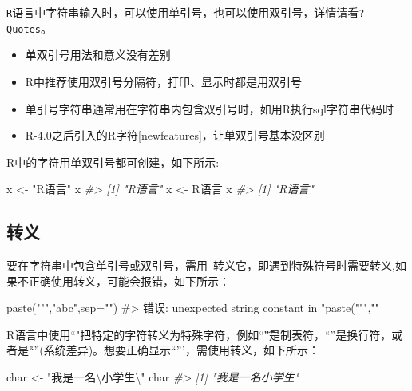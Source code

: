 \documentclass[
]{book}
\newenvironment{Shaded}{\begin{snugshade}}{\end{snugshade}}
\newcommand{\CommentTok}[1]{\textcolor[rgb]{0.56,0.35,0.01}{\textit{#1}}}
\newcommand{\FunctionTok}[1]{\textcolor[rgb]{0.00,0.00,0.00}{#1}}
\newcommand{\NormalTok}[1]{#1}
\newcommand{\OtherTok}[1]{\textcolor[rgb]{0.56,0.35,0.01}{#1}}
\newcommand{\SpecialCharTok}[1]{\textcolor[rgb]{0.00,0.00,0.00}{#1}}
\newcommand{\StringTok}[1]{\textcolor[rgb]{0.31,0.60,0.02}{#1}}
\begin{document}
\texttt{R}语言中字符串输入时，可以使用单引号，也可以使用双引号，详情请看\texttt{?Quotes}。

\begin{itemize}
\item
  单双引号用法和意义没有差别
\item
  R中推荐使用双引号分隔符，打印、显示时都是用双引号
\item
  单引号字符串通常用在字符串内包含双引号时，如用R执行sql字符串代码时
\item
  R-4.0之后引入的R字符{[}newfeatures{]}，让单双引号基本没区别
\end{itemize}

R中的字符用单双引号都可创建，如下所示:

\begin{Shaded}
\begin{Highlighting}[]
\NormalTok{x }\OtherTok{\textless{}{-}} \StringTok{"R语言"}
\NormalTok{x}
\CommentTok{\#\textgreater{} [1] "R语言"}
\NormalTok{x }\OtherTok{\textless{}{-}} \StringTok{\textquotesingle{}R语言\textquotesingle{}}
\NormalTok{x}
\CommentTok{\#\textgreater{} [1] "R语言"}
\end{Highlighting}
\end{Shaded}

\hypertarget{ux8f6cux4e49}{%
\subsection{转义}\label{ux8f6cux4e49}}

要在字符串中包含单引号或双引号，需用~转义它，即遇到特殊符号时需要转义,如果不正确使用转义，可能会报错，如下所示：

\begin{Shaded}
\begin{Highlighting}[]
\FunctionTok{paste}\NormalTok{(}\StringTok{""","}\NormalTok{abc}\StringTok{",sep="")}
\StringTok{\#\textgreater{} 错误: unexpected string constant in "}\FunctionTok{paste}\NormalTok{(}\StringTok{""",""}
\end{Highlighting}
\end{Shaded}

R语言中使用``"把特定的字符转义为特殊字符，例如``\t”是制表符，``\n''是换行符，或者是``\r\n''(系统差异)。想要正确显示``'''，需使用转义，如下所示：

\begin{Shaded}
\begin{Highlighting}[]
\NormalTok{char }\OtherTok{\textless{}{-}} \StringTok{"我是一名}\SpecialCharTok{\textbackslash{}\textquotesingle{}}\StringTok{小学生}\SpecialCharTok{\textbackslash{}\textquotesingle{}}\StringTok{"} 
\NormalTok{char}
\CommentTok{\#\textgreater{} [1] "我是一名\textquotesingle{}小学生\textquotesingle{}"}
\end{Highlighting}
\end{Shaded}
\end{document}
